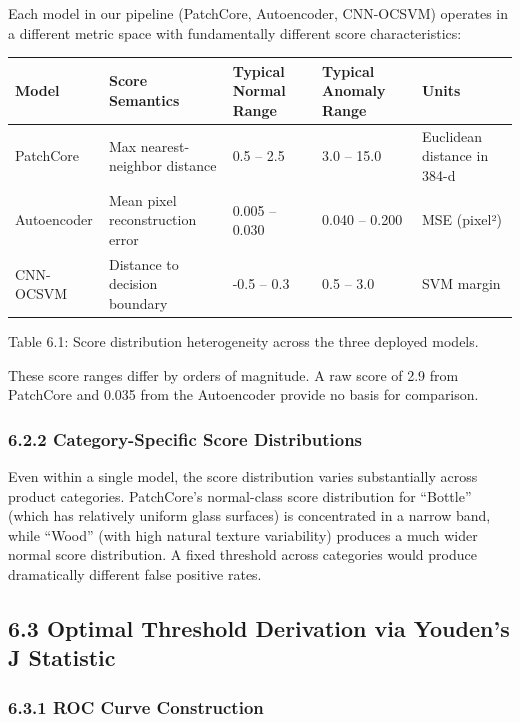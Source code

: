 \documentclass[12pt, a4paper, oneside]{report}
\begin{document}
Each model in our pipeline (PatchCore, Autoencoder, CNN-OCSVM) operates in a different metric space with fundamentally different score characteristics:

{\def\LTcaptype{none} %
\begin{longtable}[]{@{}lllll@{}}
\toprule\noalign{}
Model & Score Semantics & Typical Normal Range & Typical Anomaly Range & Units \\
\midrule\noalign{}
\endhead
\bottomrule\noalign{}
\endlastfoot
PatchCore & Max nearest-neighbor distance & 0.5 -- 2.5 & 3.0 -- 15.0 & Euclidean distance in 384-d \\
Autoencoder & Mean pixel reconstruction error & 0.005 -- 0.030 & 0.040 -- 0.200 & MSE (pixel²) \\
CNN-OCSVM & Distance to decision boundary & -0.5 -- 0.3 & 0.5 -- 3.0 & SVM margin \\
\end{longtable}
}

Table 6.1: Score distribution heterogeneity across the three deployed models.

These score ranges differ by orders of magnitude. A raw score of 2.9 from PatchCore and 0.035 from the Autoencoder provide no basis for comparison.

\subsubsection{6.2.2 Category-Specific Score Distributions}\label{category-specific-score-distributions}

Even within a single model, the score distribution varies substantially across product categories. PatchCore's normal-class score distribution for ``Bottle'' (which has relatively uniform glass surfaces) is concentrated in a narrow band, while ``Wood'' (with high natural texture variability) produces a much wider normal score distribution. A fixed threshold across categories would produce dramatically different false positive rates.

\bigskip\noindent\hrulefill\bigskip

\subsection{6.3 Optimal Threshold Derivation via Youden's J Statistic}\label{optimal-threshold-derivation-via-youdens-j-statistic}

\subsubsection{6.3.1 ROC Curve Construction}\label{roc-curve-construction}
\end{document}

